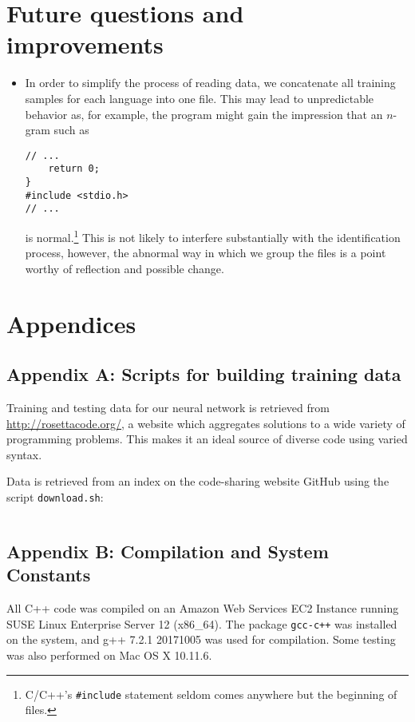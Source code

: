 \documentclass{article}
\begin{document}
\section{Future questions and improvements}
\begin{itemize}
  \item{In order to simplify the process of reading data, we concatenate all training samples for each language into one file. This may lead to unpredictable behavior as, for example, the program might gain the impression that an $n$-gram such as
  \begin{verbatim}
// ...
    return 0;
}
#include <stdio.h>
// ...
  \end{verbatim}
  is normal.\footnote{C/C++'s \texttt{\#include} statement seldom comes anywhere but the beginning of files.} This is not likely to interfere substantially with the identification process, however, the abnormal way in which we group the files is a point worthy of reflection and possible change.}
\end{itemize}

\section{Appendices}

\label{sec:appendix_a}
\subsection{Appendix A: Scripts for building training data}
Training and testing data for our neural network is retrieved from \url{http://rosettacode.org/}, a website which aggregates solutions to a wide variety of programming problems. This makes it an ideal source of diverse code using varied syntax.

Data is retrieved from an index on the code-sharing website GitHub\cite{rosettacodegh} using the script \texttt{download.sh}:
\inputminted{bash}{code/data/download.sh}

\label{sec:appendix_b}
\subsection{Appendix B: Compilation and System Constants}
All C++ code was compiled on an Amazon Web Services EC2 Instance running SUSE Linux Enterprise Server 12 (x86\_64). The package \texttt{gcc-c++} was installed on the system, and g++ 7.2.1 20171005 was used for compilation. Some testing was also performed on Mac OS X 10.11.6.
\end{document}
